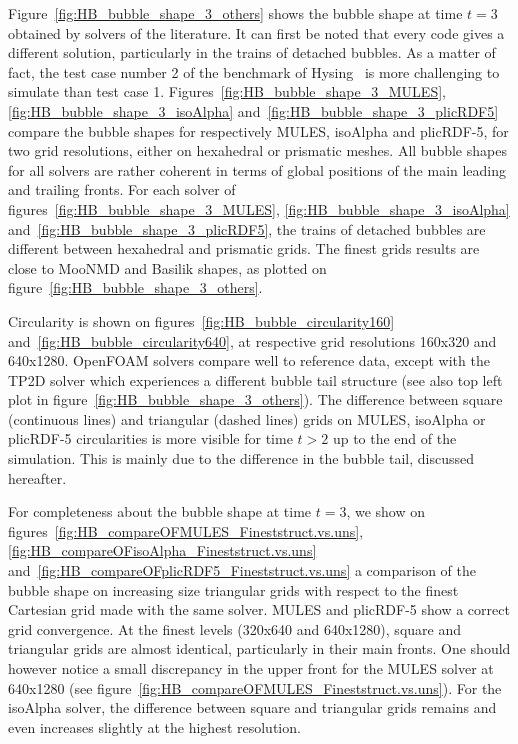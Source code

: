 \documentclass[review]{elsarticle}
\begin{document}
Figure~\ref{fig:HB_bubble_shape_3_others} shows the bubble shape at time $t=3$ obtained by solvers of the literature. It can first be noted that every code gives a different solution, particularly in the trains of detached bubbles. As a matter of fact, the test case number 2 of the benchmark of Hysing~\cite{Hysing2009} is more challenging to simulate than test case 1. Figures~\ref{fig:HB_bubble_shape_3_MULES}, \ref{fig:HB_bubble_shape_3_isoAlpha} and~\ref{fig:HB_bubble_shape_3_plicRDF5} compare the bubble shapes for respectively MULES, isoAlpha and plicRDF-5, for two grid resolutions, either on hexahedral or prismatic meshes. All bubble shapes for all solvers are rather coherent in terms of global positions of the main leading and trailing fronts. For each solver of figures~\ref{fig:HB_bubble_shape_3_MULES}, \ref{fig:HB_bubble_shape_3_isoAlpha} and~\ref{fig:HB_bubble_shape_3_plicRDF5}, the trains of detached bubbles are different between hexahedral and prismatic grids. The finest grids results are close to MooNMD and Basilik shapes, as plotted on figure~\ref{fig:HB_bubble_shape_3_others}. 

Circularity is shown on figures~\ref{fig:HB_bubble_circularity160} and~\ref{fig:HB_bubble_circularity640}, at respective grid resolutions 160x320 and 640x1280. OpenFOAM solvers compare well to reference data, except with the TP2D solver which experiences a different bubble tail structure (see also top left plot in figure~\ref{fig:HB_bubble_shape_3_others}). The difference between square (continuous lines) and triangular (dashed lines) grids on MULES, isoAlpha or plicRDF-5 circularities is more visible for time $t>2$ up to the end of the simulation. This is mainly due to the difference in the bubble tail, discussed hereafter. 

For completeness about the bubble shape at time $t=3$, we show on figures~\ref{fig:HB_compareOFMULES_Fineststruct.vs.uns}, \ref{fig:HB_compareOFisoAlpha_Fineststruct.vs.uns} and~\ref{fig:HB_compareOFplicRDF5_Fineststruct.vs.uns} a comparison of the bubble shape on increasing size triangular grids with respect to the finest Cartesian grid made with the same solver. MULES and plicRDF-5 show a correct grid convergence. At the finest levels (320x640 and 640x1280), square and triangular grids are almost identical, particularly in their main fronts. One should however notice a small discrepancy in the upper front for the MULES solver at 640x1280 (see figure~\ref{fig:HB_compareOFMULES_Fineststruct.vs.uns}). For the isoAlpha solver, the difference between square and triangular grids remains and even increases slightly at the highest resolution.
\end{document}
